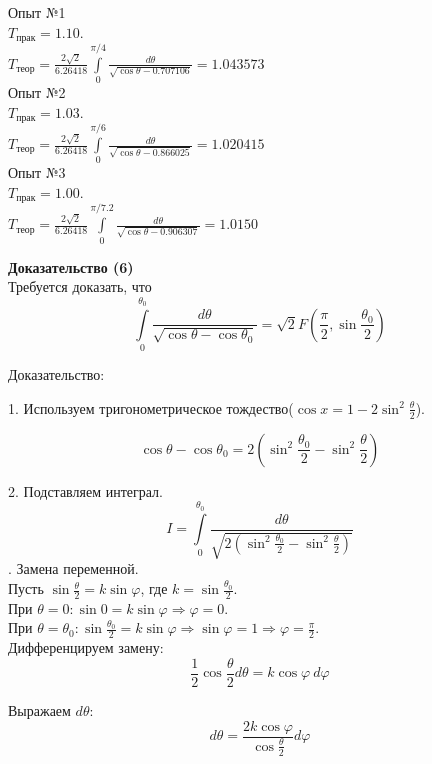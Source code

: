 \documentclass[aspectratio=169]{beamer}
\begin{document}
Опыт №1\\
\(T_{\text{прак}}=1.10\).\\
\(T_{\text{теор}}=\frac{2\sqrt{2}}{6.26418}\int\limits_0^{\pi/4}{\frac{d\theta}{\sqrt{\cos{\theta}-0.707106}}}=1.043573\)\\

Опыт №2\\
\(T_{\text{прак}}=1.03\).\\
\(T_{\text{теор}}=\frac{2\sqrt{2}}{6.26418}\int\limits_0^{\pi/6}{\frac{d\theta}{\sqrt{\cos{\theta}-0.866025}}}=1.020415\)\\

Опыт №3\\
\(T_{\text{прак}}=1.00\).\\
\(T_{\text{теор}}=\frac{2\sqrt{2}}{6.26418}\int\limits_0^{\pi/7.2}{\frac{d\theta}{\sqrt{\cos{\theta}-0.906307}}}=1.0150\)\\
	\newpage
	
	\large \textbf{\textcolor{structure.fg}{Доказательство (6)}}\\
	
	Требуется доказать, что
	\[\int\limits_0^{\theta_0}\frac{d\theta}{\sqrt{\cos{\theta}-\cos{\theta_0}}}=\sqrt{2}F\left(\frac{\pi}{2}, \sin{\frac{\theta_0}{2}}\right)\]
	
	Доказательство:
	
	1. Используем тригонометрическое тождество(\(\cos{x}=1-2\sin^2{\frac{\theta}{2}}\)).
	
	\[\cos{\theta}-\cos{\theta_0}=2\left(\sin^2{\frac{\theta_0}{2}}-\sin^2{\frac{\theta}{2}}\right)\]
	
	2. Подставляем интеграл.
	\[I=\int\limits_0^{\theta_0}\frac{d\theta}{\sqrt{2(\sin^2\frac{\theta_0}{2}-\sin^2\frac{\theta}{2})}}\]
	. Замена переменной.\\
	Пусть \(\sin\frac{\theta}{2}=k\sin{\varphi}\), где \(k=\sin\frac{\theta_0}{2}\).\\
	При \(\theta=0: \sin{0}=k\sin\varphi\Rightarrow\varphi=0\).\\
	При \(\theta=\theta_0: \sin{\frac{\theta_0}{2}}=k\sin\varphi\Rightarrow\sin\varphi=1\Rightarrow\varphi=\frac{\pi}{2}\).\\
	
	Дифференцируем замену:\\
	\[\frac{1}{2}\cos\frac{\theta}{2}d\theta=k\cos\varphi\ d\varphi\]
	
	Выражаем \(d\theta\):\\
	\[d\theta=\frac{2k\cos\varphi}{\cos\frac{\theta}{2}}d\varphi\]
	
\end{document}
